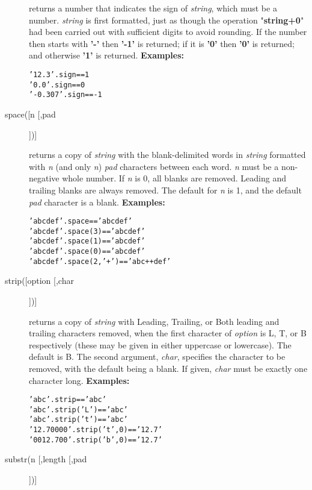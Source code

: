 \begin{description}
returns a number that indicates the sign of \emph{string}, which
must be a number.
\emph{string} is first formatted, just as though the operation
"\textbf{string+0}" had been carried out with sufficient digits
to avoid rounding.
If the number then starts with \textbf{'-'} then \textbf{'-1'} is
returned; if it is \textbf{'0'} then \textbf{'0'} is returned; and
otherwise \textbf{'1'} is returned.
 \textbf{Examples:}
\begin{alltt}
'12.3'.sign    ==  1
'0.0'.sign     ==  0
' -0.307'.sign == -1
\end{alltt}
\item[space([n [,pad]])]\label{refspace}

returns a copy of \emph{string} with the blank-delimited words in
\emph{string} formatted with \emph{n} (and only \emph{n})
\emph{pad} characters between each word.
\emph{n} must be a non-negative whole number.
If \emph{n} is 0, all blanks are removed.
Leading and trailing blanks are always removed.
The default for \emph{n} is 1, and the default \emph{pad}
character is a blank.
 \textbf{Examples:}
\begin{alltt}
'abc  def  '.space        == 'abc def'
'  abc def '.space(3)     == 'abc   def'
'abc  def  '.space(1)     == 'abc def'
'abc  def  '.space(0)     == 'abcdef'
'abc  def  '.space(2,'+') == 'abc++def'
\end{alltt}
\item[strip([option [,char]])]\label{refstrip}

returns a copy of \emph{string} with Leading, Trailing, or Both
leading and trailing characters removed, when the first character of
\emph{option} is L, T, or B respectively (these may be given in
either uppercase or lowercase).  The default is B.
The second argument, \emph{char}, specifies the character to be
removed, with the default being a blank.
If given, \emph{char} must be exactly one character long.
 \textbf{Examples:}
\begin{alltt}
'  ab c  '.strip        == 'ab c'
'  ab c  '.strip('L')   == 'ab c  '
'  ab c  '.strip('t')   == '  ab c'
'12.70000'.strip('t',0) == '12.7'
'0012.700'.strip('b',0) == '12.7'
\end{alltt}
\item[substr(n [,length [,pad]])]\label{refsubstr}


\end{description}
